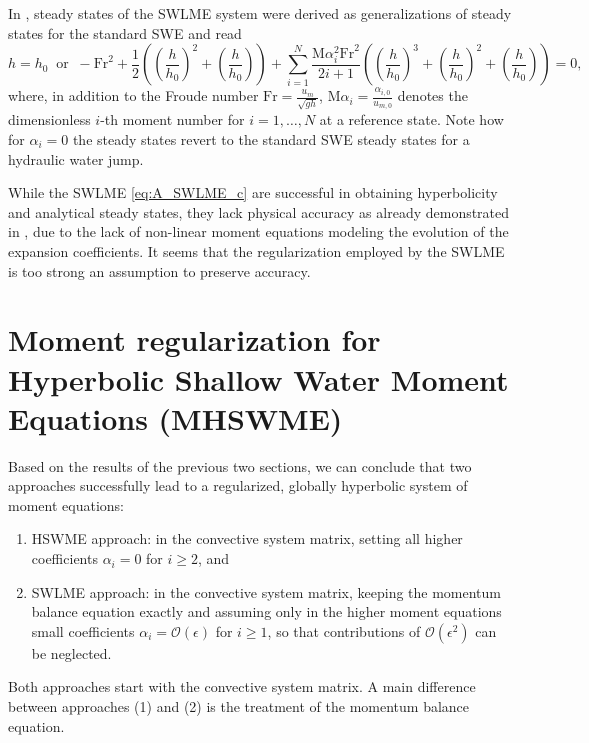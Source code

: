 \documentclass[a4paper, 11pt]{article}
\newcommand{\Fr}{\textrm{Fr}} %
\newcommand{\Ma}{\textrm{M}\alpha} %
\begin{document}
In \cite{Koellermeier2020i}, steady states of the SWLME system were derived as generalizations of steady states for the standard SWE and read
\begin{equation}\label{eq:SWLME_steady_states}
    h=h_0 ~\textrm{ or } ~ -\!\Fr^2 + \frac{1}{2} \left(\!\left(\frac{h}{h_0}\right)^2\!+\!\left(\frac{h}{h_0}\right)\!\right) + \sum\limits_{i=1}^{N}\frac{\Ma_i^2 \Fr^2}{2i+1}  \left(\! \left(\frac{h}{h_0}\right)^3\!+\!\left(\frac{h}{h_0}\right)^2\!+\!\left(\frac{h}{h_0}\right)\!\right)\!=\!0,
\end{equation}
where, in addition to the Froude number $\Fr=\frac{u_m}{\sqrt{gh}}$, $\Ma_i = \frac{\alpha_{i,0}}{u_{m,0}}$ denotes the dimensionless $i$-th moment number for $i=1, \ldots, N$ at a reference state.
Note how for $\alpha_i = 0$ the steady states revert to the standard SWE steady states for a hydraulic water jump.

While the SWLME \eqref{eq:A_SWLME_c} are successful in obtaining hyperbolicity and analytical steady states, they lack physical accuracy as already demonstrated in \cite{Huang2022}, due to the lack of non-linear moment equations modeling the evolution of the expansion coefficients. It seems that the regularization employed by the SWLME is too strong an assumption to preserve accuracy.

\section{Moment regularization for Hyperbolic Shallow Water Moment Equations (MHSWME)}
\label{sec:MHSWME}
Based on the results of the previous two sections, we can conclude that two approaches successfully lead to a regularized, globally hyperbolic system of moment equations:
\begin{enumerate}
    \item[(1)] HSWME approach: in the convective system matrix, setting all higher coefficients $\alpha_i=0$ for $i\geq 2$, and
    \item[(2)] SWLME approach: in the convective system matrix, keeping the momentum balance equation exactly and assuming only in the higher moment equations small coefficients $\alpha_i=\mathcal{O}(\epsilon)$ for $i\geq 1$, so that contributions of $\mathcal{O}(\epsilon^2)$ can be neglected.
\end{enumerate}
Both approaches start with the convective system matrix. A main difference between approaches (1) and (2) is the treatment of the momentum balance equation.
\end{document}
